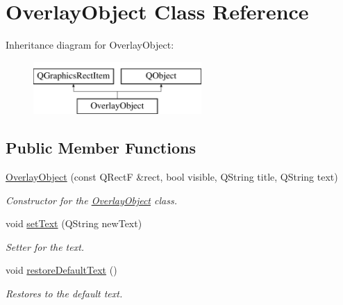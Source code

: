 \hypertarget{class_overlay_object}{\section{Overlay\+Object Class Reference}
\label{class_overlay_object}
}
Inheritance diagram for Overlay\+Object\+:\begin{figure}[H]
\begin{center}
\leavevmode
\includegraphics[height=2.000000cm]{class_overlay_object}
\end{center}
\end{figure}
\subsection*{Public Member Functions}
\begin{DoxyCompactItemize}
\item 
\hyperlink{class_overlay_object_a36e5d66953077671bce1086531f287c2}{Overlay\+Object} (const Q\+Rect\+F \&rect, bool visible, Q\+String title, Q\+String text)
\begin{DoxyCompactList}\small\item\em Constructor for the \hyperlink{class_overlay_object}{Overlay\+Object} class. \end{DoxyCompactList}\item 
void \hyperlink{class_overlay_object_ab7a69b842c942d9c5e24d44fbc5d150d}{set\+Text} (Q\+String new\+Text)
\begin{DoxyCompactList}\small\item\em Setter for the text. \end{DoxyCompactList}\item 
void \hyperlink{class_overlay_object_ad92a1142945e2bc7344ad4048d8916c8}{restore\+Default\+Text} ()
\begin{DoxyCompactList}\small\item\em Restores to the default text. \end{DoxyCompactList}\end{DoxyCompactItemize}
